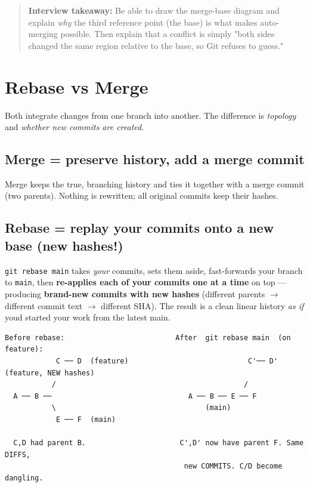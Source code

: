 \documentclass[11pt]{article}
\begin{document}
\begin{quote}
\textbf{Interview takeaway:} Be able to draw the merge-base diagram and explain \emph{why} the third reference point (the base) is what makes auto-merging possible. Then explain that a conflict is simply "both sides changed the same region relative to the base, so Git refuses to guess."
\end{quote}

\section{Rebase vs Merge}\label{rebase-vs-merge}

Both integrate changes from one branch into another. The difference is \emph{topology} and \emph{whether new commits are created}.

\subsection{Merge = preserve history, add a merge commit}\label{merge--preserve-history-add-a-merge-commit}

Merge keeps the true, branching history and ties it together with a merge commit (two parents). Nothing is rewritten; all original commits keep their hashes.

\subsection{Rebase = replay your commits onto a new base (new hashes!)}\label{rebase--replay-your-commits-onto-a-new-base-new-hashes}

\texttt{git\ rebase\ main} takes \emph{your} commits, sets them aside, fast-forwards your branch to \texttt{main}, then \textbf{re-applies each of your commits one at a time} on top --- producing \textbf{brand-new commits with new hashes} (different parents \(\rightarrow\) different commit text \(\rightarrow\) different SHA). The result is a clean linear history \emph{as if} you\textquotesingle d started your work from the latest main.

\setcodelang{}

\begin{verbatim}
Before rebase:                          After  git rebase main  (on feature):
            C ── D  (feature)                            C'── D'  (feature, NEW hashes)
           /                                            /
  A ── B ──                                A ── B ── E ── F
           \                                   (main)
            E ── F  (main)

  C,D had parent B.                      C',D' now have parent F. Same DIFFS,
                                          new COMMITS. C/D become dangling.
\end{verbatim}
\end{document}
